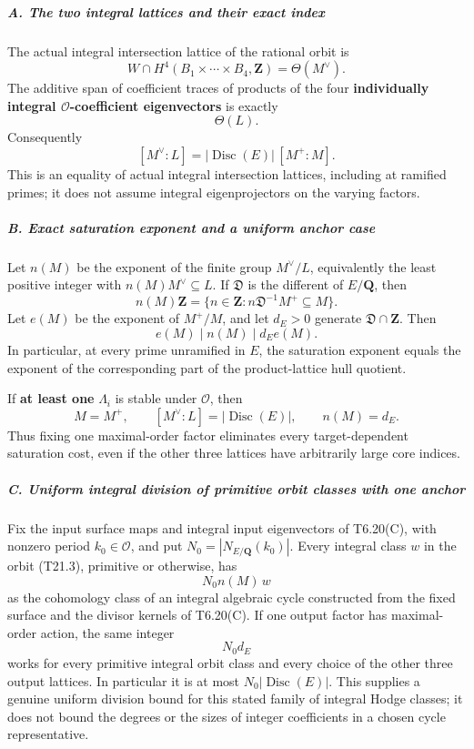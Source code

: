 \subparagraph{A. The two integral lattices and their exact index}\label{a.-the-two-integral-lattices-and-their-exact-index}

The actual integral intersection lattice of the rational orbit is \[
 W\cap H^4(B_1\times\cdots\times B_4,\mathbf Z)
     =\Theta(M^\vee).
 \tag{T21.3}
\] The additive span of coefficient traces of products of the four \textbf{individually integral \(\mathcal O\)-coefficient eigenvectors} is exactly \[
 \Theta(L).
 \tag{T21.4}
\] Consequently \[
 [M^\vee:L]
   =|\operatorname{Disc}(E)|\,[M^+:M].
 \tag{T21.5}
\] This is an equality of actual integral intersection lattices, including at ramified primes; it does not assume integral eigenprojectors on the varying factors.

\subparagraph{B. Exact saturation exponent and a uniform anchor case}\label{b.-exact-saturation-exponent-and-a-uniform-anchor-case}

Let \(n(M)\) be the exponent of the finite group \(M^\vee/L\), equivalently the least positive integer with \(n(M)M^\vee\subseteq L\). If \(\mathfrak D\) is the different of \(E/\mathbf Q\), then \[
 n(M)\mathbf Z
 =\{n\in\mathbf Z:n\mathfrak D^{-1}M^+\subseteq M\}.
 \tag{T21.6}
\] Let \(e(M)\) be the exponent of \(M^+/M\), and let \(d_E>0\) generate \(\mathfrak D\cap\mathbf Z\). Then \[
 e(M)\mid n(M)\mid d_E e(M).
 \tag{T21.7}
\] In particular, at every prime unramified in \(E\), the saturation exponent equals the exponent of the corresponding part of the product-lattice hull quotient.

If \textbf{at least one} \(\Lambda_i\) is stable under \(\mathcal O\), then \[
 M=M^+,
 \qquad [M^\vee:L]=|\operatorname{Disc}(E)|,
 \qquad n(M)=d_E.
 \tag{T21.8}
\] Thus fixing one maximal-order factor eliminates every target-dependent saturation cost, even if the other three lattices have arbitrarily large core indices.

\subparagraph{C. Uniform integral division of primitive orbit classes with one anchor}\label{c.-uniform-integral-division-of-primitive-orbit-classes-with-one-anchor}

Fix the input surface maps and integral input eigenvectors of T6.20(C), with nonzero period \(k_0\in\mathcal O\), and put \(N_0=|N_{E/\mathbf Q}(k_0)|\). Every integral class \(w\) in the orbit (T21.3), primitive or otherwise, has \[
 N_0 n(M)\,w
\] as the cohomology class of an integral algebraic cycle constructed from the fixed surface and the divisor kernels of T6.20(C). If one output factor has maximal-order action, the same integer \[
 N_0d_E
 \tag{T21.9}
\] works for every primitive integral orbit class and every choice of the other three output lattices. In particular it is at most \(N_0|\operatorname{Disc}(E)|\). This supplies a genuine uniform division bound for this stated family of integral Hodge classes; it does not bound the degrees or the sizes of integer coefficients in a chosen cycle representative.

